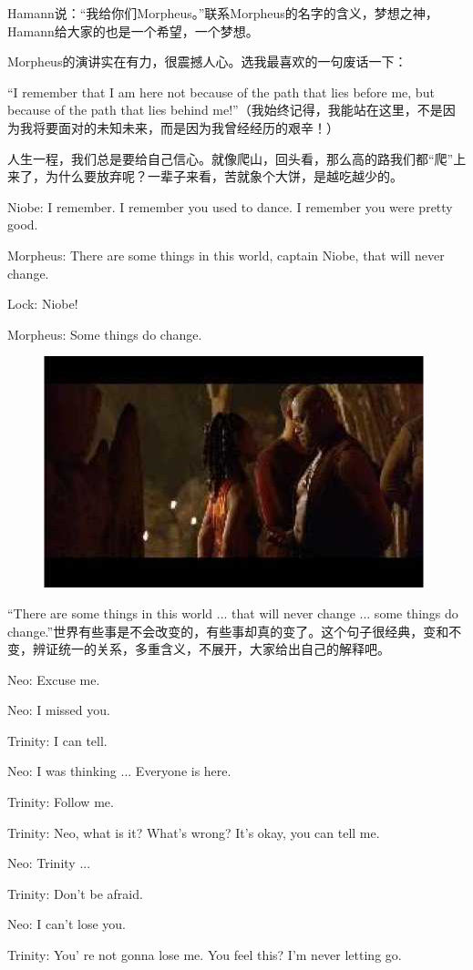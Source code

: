 \documentclass{ctexart}
\newenvironment{myquote}{\color{green} \setlength{\leftskip}{6em} \setlength{\rightskip}{4em} \setlength{\parindent}{-2em}}{\par}
\begin{document}
Hamann说：“我给你们Morpheus。”联系Morpheus的名字的含义，梦想之神，Hamann给大家的也是一个希望，一个梦想。

Morpheus的演讲实在有力，很震撼人心。选我最喜欢的一句废话一下：

“I remember that I am here not because of the path that lies before me, but because of the path that lies behind me!”（我始终记得，我能站在这里，不是因为我将要面对的未知未来，而是因为我曾经经历的艰辛！）

人生一程，我们总是要给自己信心。就像爬山，回头看，那么高的路我们都“爬”上来了，为什么要放弃呢？一辈子来看，苦就象个大饼，是越吃越少的。

\begin{myquote}
Niobe: I remember. I remember you used to dance. I remember you were pretty good.

Morpheus: There are some things in this world, captain Niobe, that will never change.

Lock: Niobe!

Morpheus: Some things do change.
\end{myquote}

\begin{figure}[htb]
\centering
\includegraphics[width=0.5\linewidth]{fig/read_reloaded-42}
\end{figure}

“There are some things in this world ... that will never change ... some things do change.”世界有些事是不会改变的，有些事却真的变了。这个句子很经典，变和不变，辨证统一的关系，多重含义，不展开，大家给出自己的解释吧。

\begin{myquote}
Neo: Excuse me.

Neo: I missed you.

Trinity: I can tell.

Neo: I was thinking ... Everyone is here.

Trinity: Follow me.

Trinity: Neo, what is it? What's wrong? It's okay, you can tell me.

Neo: Trinity ...

Trinity: Don't be afraid.

Neo: I can't lose you.

Trinity: You' re not gonna lose me. You feel this? I'm never letting go.
\end{myquote}
\end{document}
